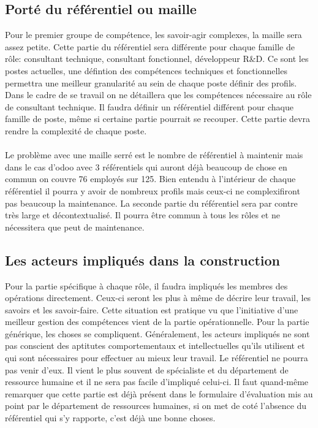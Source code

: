 \subsection{Porté du référentiel ou maille}
Pour le premier groupe de compétence, les savoir-agir complexes, la maille sera assez petite. Cette partie du référentiel sera différente pour chaque famille de rôle: consultant technique, consultant fonctionnel, développeur R\&D. Ce sont les postes actuelles, une défintion des compétences techniques et fonctionnelles permettra une meilleur granularité au sein de chaque poste définir des profils. Dans le cadre de se travail on ne détaillera que les compétences nécessaire au rôle de consultant technique. Il faudra définir un référentiel différent pour chaque famille de poste, même si certaine partie pourrait se recouper. Cette partie devra rendre la complexité de chaque poste. 

\paragraph{}Le problème avec une maille serré est le nombre de référentiel à maintenir mais dans le cas d'odoo avec 3 référentiels qui auront déjà beaucoup de chose en commun on couvre 76 employés sur 125. Bien entendu à l'intérieur de chaque référentiel il pourra y avoir de nombreux profils mais ceux-ci ne complexifiront pas beaucoup la maintenance. La seconde partie du référentiel sera par contre très large et décontextualisé. Il pourra être commun à tous les rôles et ne nécessitera que peut de maintenance. 

\subsection{Les acteurs impliqués dans la construction}
Pour la partie spécifique à chaque rôle, il faudra impliqués les membres des opérations directement. Ceux-ci seront les plus à même de décrire leur travail, les savoirs et les savoir-faire. Cette situation est pratique vu que l'initiative d'une meilleur gestion des compétences vient de la partie opérationnelle. Pour la partie générique, les choses se compliquent. Généralement, les acteurs impliqués ne sont pas conscient des aptitutes comportementaux et intellectuelles qu'ils utilisent et qui sont nécessaires pour effectuer au mieux leur travail. Le référentiel ne pourra pas venir d'eux. Il vient le plus souvent de spécialiste et du département de ressource humaine et il ne sera pas facile d'impliqué celui-ci. Il faut quand-même remarquer que cette partie est déjà présent dans le formulaire d'évaluation mis au point par le département de ressources humaines, si on met de coté l'absence du référentiel qui s'y rapporte, c'est déjà une bonne choses.



